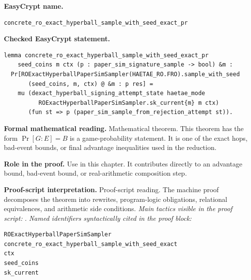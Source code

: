\begin{formaltheorem}
\noindent\textbf{EasyCrypt name.}
\begin{lstlisting}[language=EasyCrypt,basicstyle=\ttfamily\scriptsize]
concrete_ro_exact_hyperball_sample_with_seed_exact_pr
\end{lstlisting}
\noindent\textbf{Checked EasyCrypt statement.}
\begin{lstlisting}[language=EasyCrypt,basicstyle=\ttfamily\scriptsize]
lemma concrete_ro_exact_hyperball_sample_with_seed_exact_pr
    seed_coins m ctx (p : paper_sim_signature_sample -> bool) &m :
  Pr[ROExactHyperballPaperSimSampler(HAETAE_RO.FRO).sample_with_seed
       (seed_coins, m, ctx) @ &m : p res] =
    mu (dexact_hyperball_signing_attempt_state haetae_mode
          ROExactHyperballPaperSimSampler.sk_current{m} m ctx)
       (fun st => p (paper_sim_sample_from_rejection_attempt st)).
\end{lstlisting}
\noindent\textbf{Formal mathematical reading.}
Mathematical theorem. This theorem has the form \(\Pr[G:E] = B\) is a game-probability statement.  It is one of the exact hops, bad-event bounds, or final advantage inequalities used in the reduction.

\noindent\textbf{Role in the proof.}
Use in this chapter. It contributes directly to an advantage bound, bad-event bound, or real-arithmetic composition step.

\noindent\textbf{Proof-script interpretation.}
Proof-script reading. The machine proof decomposes the theorem into rewrites, program-logic obligations, relational equivalences, and arithmetic side conditions.
\emph{Main tactics visible in the proof script:} .
\emph{Named identifiers syntactically cited in the proof block:}
\begin{lstlisting}[language=EasyCrypt,basicstyle=\ttfamily\scriptsize]
ROExactHyperballPaperSimSampler
concrete_ro_exact_hyperball_sample_with_seed_exact
ctx
seed_coins
sk_current
\end{lstlisting}

\end{formaltheorem}

